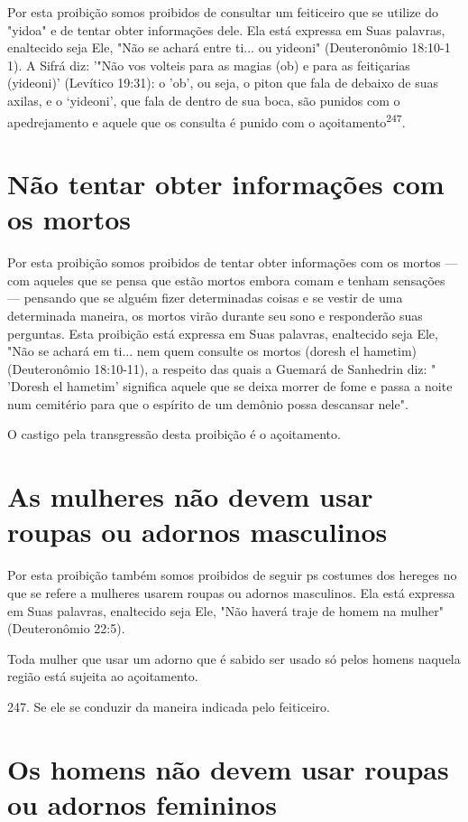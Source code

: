 \begin{itemize}
\begin{enumrate}
\begin{itemize}
\begin{itemize}
\begin{itemize}
Por esta proibição somos proibidos de consultar um feiticeiro que se
utilize do "yidoa" e de tentar obter informações dele. Ela está expressa
em Suas palavras, enaltecido seja Ele, "Não se achará entre ti... ou
yideoni" (Deute­ronômio 18:10-1 1). A Sifrá diz: '"Não vos volteis para
as magias (ob) e para as feitiçarias (yideoni)' (Levítico 19:31): o
'ob', ou seja, o piton que fala de debaixo de suas axilas, e o
`yideoni', que fala de dentro de sua boca, são punidos com o
apedrejamento e aquele que os consulta é punido com o
açoitamento\textsuperscript{247}.

\section{Não tentar obter informações com os mortos}

Por esta proibição somos proibidos de tentar obter informações com os
mortos --- com aqueles que se pensa que estão mortos embora comam e
te­nham sensações --- pensando que se alguém fizer determinadas coisas e
se vestir de uma determinada maneira, os mortos virão durante seu sono e
responderão suas perguntas. Esta proibição está expressa em Suas
palavras, enaltecido seja Ele, "Não se achará em ti... nem quem consulte
os mortos (doresh el hametim) (Deuteronômio 18:10-11), a respeito das
quais a Guemará de Sanhedrin diz: " 'Do­resh el hametim' significa
aquele que se deixa morrer de fome e passa a noite num cemitério para
que o espírito de um demônio possa descansar nele".

O castigo pela transgressão desta proibição é o açoitamento.


\section{As mulheres não devem usar roupas ou adornos masculinos}


Por esta proibição também somos proibidos de seguir ps costumes dos
hereges no que se refere a mulheres usarem roupas ou adornos
masculi­nos. Ela está expressa em Suas palavras, enaltecido seja Ele,
"Não haverá traje de homem na mulher" (Deuteronômio 22:5).

Toda mulher que usar um adorno que é sabido ser usado só pelos homens
naquela região está sujeita ao açoitamento.

247. Se ele se conduzir da maneira indicada pelo feiticeiro.


\section{Os homens não devem usar roupas ou adornos femininos}


\end{itemize}
\end{itemize}
\end{itemize}
\end{enumrate}
\end{itemize}
